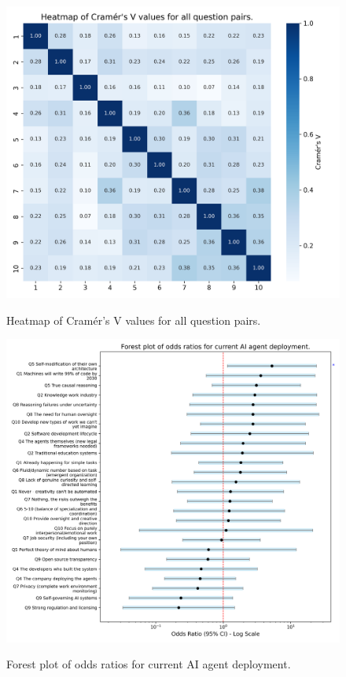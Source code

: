\documentclass{article}
\begin{document}
\begin{figure}[htbp]

{\includegraphics[width=\textwidth, keepaspectratio]{figs/cramers_v_heatmap_figure2.png}}

\caption{Heatmap of Cramér's V values for all
question pairs.}

\end{figure}%

\begin{figure}[htbp]

{\includegraphics[width=\textwidth, keepaspectratio]{figs/logit_forest_plot_figure4.png}}

\caption{Forest plot of odds ratios for current
AI agent deployment.}

\end{figure}%
\end{document}
